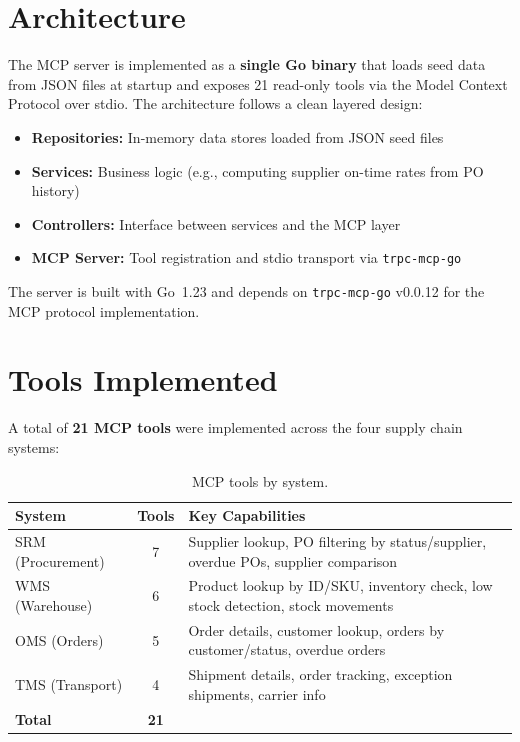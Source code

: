 \documentclass[12pt,a4paper]{report}
\begin{document}
\section{Architecture}

The MCP server is implemented as a \textbf{single Go binary} that loads seed data from JSON files at startup and exposes 21 read-only tools via the Model Context Protocol over stdio. The architecture follows a clean layered design:

\begin{itemize}[itemsep=0.3em]
    \item \textbf{Repositories:} In-memory data stores loaded from JSON seed files
    \item \textbf{Services:} Business logic (e.g., computing supplier on-time rates from PO history)
    \item \textbf{Controllers:} Interface between services and the MCP layer
    \item \textbf{MCP Server:} Tool registration and stdio transport via \texttt{trpc-mcp-go}
\end{itemize}

The server is built with Go~1.23 and depends on \texttt{trpc-mcp-go} v0.0.12 for the MCP protocol implementation.

\section{Tools Implemented}

A total of \textbf{21 MCP tools} were implemented across the four supply chain systems:

\begin{table}[H]
\centering\small
\caption{MCP tools by system.}
\begin{tabularx}{\textwidth}{@{} l c X @{}}
\toprule
\textbf{System} & \textbf{Tools} & \textbf{Key Capabilities} \\
\midrule
SRM (Procurement) & 7 & Supplier lookup, PO filtering by status/supplier, overdue POs, supplier comparison \\
WMS (Warehouse)   & 6 & Product lookup by ID/SKU, inventory check, low stock detection, stock movements \\
OMS (Orders)      & 5 & Order details, customer lookup, orders by customer/status, overdue orders \\
TMS (Transport)   & 4 & Shipment details, order tracking, exception shipments, carrier info \\
\midrule
\textbf{Total}    & \textbf{21} & \\
\bottomrule
\end{tabularx}
\end{table}
\end{document}
